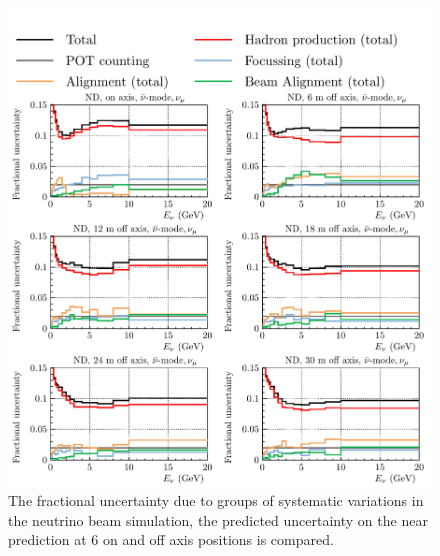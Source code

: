 \documentclass{article}
\begin{document}
\begin{figure}
  \centering
  \includegraphics[width=\textwidth]{plots/fracerrs/nubarmode_numu_ErrType_OffAxis}
  \caption{The fractional uncertainty due to groups of systematic variations in the neutrino beam simulation, the predicted uncertainty on the near prediction at 6 on and off axis positions is compared.}
  \label{fig:grp_nubar_numu_offaxis}
\end{figure}
\end{document}

